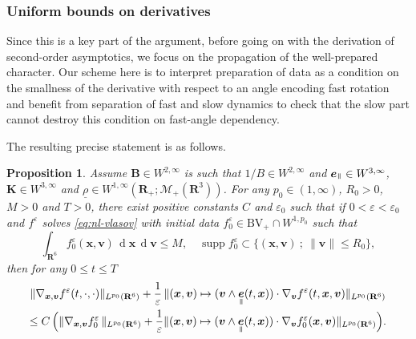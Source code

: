 \documentclass[10pt]{amsart}
\let\mathcal\mathscr
\newcommand{\sep}{\ ;\ }
\newcommand{\BV}{\mathrm{BV}}
\let\eps\varepsilon
\DeclareMathOperator\dD{d}\let\dd\dD
\theoremstyle{plain}
\newtheorem{proposition}[theorem]{Proposition}
\theoremstyle{definition}
\newcommand{\bpr}{\begin{proposition}}
\newcommand{\epr}{\end{proposition}}
\newcommand\R{\mathbf R}
\newcommand\bB{{\boldsymbol B}}
\newcommand\bK{{\boldsymbol K}}
\newcommand\bfv{{\boldsymbol v}}
\newcommand\bfx{{\boldsymbol x}}
\newcommand\urho{{\underline \rho}}
\newcommand\cM{{\mathcal M}}
\DeclareMathOperator{\beD}{\boldsymbol{e}}
\newcommand\eDpar{\beD_\mypar}
\newcommand{\mypar}{{\mkern3mu\vphantom{\perp}\vrule depth 0pt\mkern2mu\vrule depth 0pt\mkern3mu}}
\begin{document}
\subsubsection{Uniform bounds on derivatives}

Since this is a key part of the argument, before going on with the derivation of second-order asymptotics, we focus on the propagation of the well-prepared character. Our scheme here is to interpret preparation of data as a condition on the smallness of the derivative with respect to an angle encoding fast rotation and benefit from separation of fast and slow dynamics to check that the slow part cannot destroy this condition on fast-angle dependency.

The resulting precise statement is as follows.

\bpr\label{p:bd-nl}
Assume $\bB\in W^{2,\infty}$ is such that $1/B\in W^{2,\infty}$ and $\eDpar\in W^{3,\infty}$, $\bK\in W^{3,\infty}$ and $\urho\in W^{1,\infty}(\R_+;\cM_+(\R^3))$. For any $p_0\in(1,\infty)$, $R_0>0$, $M>0$ and $T>0$, there exist positive constants $C$ and $\eps_0$ such that if $0<\eps<\eps_0$ and $f^\eps$ solves \eqref{eq:nl-vlasov} with initial data $f_0^\eps\in \BV_+\cap W^{1,p_0}$ such that
\[
\int_{\R^6}f_0^\eps(\bfx,\bfv)\,\dD \bfx\,\dD \bfv\leq M,\quad
\operatorname{supp}f_0^\eps\subset
\{(\bfx,\bfv)\sep \|\bfv\|\leq R_0\},
\]
then for any $0\leq t\leq T$
\begin{multline*}
\|\nabla_{\bfx,\bfv}f^\eps(t,\cdot,\cdot)\|_{L^{p_0}(\R^6)}
+\frac{1}{\eps}\,\|(\bfx,\bfv)\mapsto (\bfv\wedge\eDpar(t,\bfx))\cdot\nabla_{\bfv}f^\eps(t,\bfx,\bfv)\|_{L^{p_0}(\R^6)}\\
\leq
C\,\Bigl(
\|\nabla_{\bfx,\bfv}f_0^\eps\,\|_{L^{p_0}(\R^6)}
+\frac{1}{\eps}\|(\bfx,\bfv)\mapsto (\bfv\wedge\eDpar(t,\bfx))\cdot\nabla_{\bfv}f_0^\eps(\bfx,\bfv)\|_{L^{p_0}(\R^6)}\Bigr).
\end{multline*}
\epr
\end{document}
